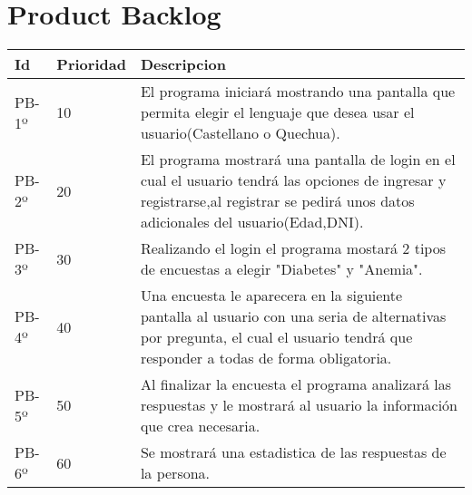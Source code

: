 \chapter{Product Backlog}



\begin{table}[htbp]
	\begin{center}
		\begin{tabular}{| p{2.1cm}| p{2.1cm} |p{8.2cm} |}
			\hline
			\textbf{Id} & \textbf {Prioridad} & \textbf{Descripcion} \\\hline    
			PB-1º & 10 & El programa iniciará mostrando una pantalla que permita elegir el lenguaje que desea usar el usuario(Castellano o Quechua).\\ \hline
			PB-2º & 20 & El programa mostrará una pantalla de login en el cual el usuario tendrá las opciones de ingresar y registrarse,al registrar se pedirá unos datos adicionales del usuario(Edad,DNI).\\ \hline
			PB-3º & 30 & Realizando el login el programa mostará 2 tipos de encuestas a elegir "Diabetes" y "Anemia".\\ \hline
			PB-4º & 40 & Una encuesta le aparecera en la siguiente pantalla al usuario con una seria de alternativas por pregunta, 
			el cual el usuario tendrá que responder a todas de forma obligatoria.\\ \hline
			PB-5º & 50 & Al finalizar la encuesta el programa analizará las respuestas y le mostrará al usuario la información que crea necesaria.\\ \hline
			PB-6º & 60 & Se mostrará una estadistica de las respuestas de la persona.\\ \hline
		\end{tabular}
	\end{center}
\end{table}


